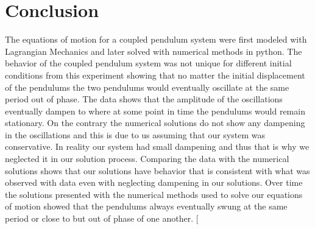\documentclass[twocolumn]{article}
\begin{document}
\section*{Conclusion}
The equations of motion for a coupled pendulum system were first modeled with Lagrangian Mechanics and later solved with numerical methods in python. The behavior of the coupled pendulum system was not unique for different initial conditions from this experiment showing that no matter the initial displacement of the pendulums the two pendulums would eventually oscillate at the same period out of phase. The data shows that the amplitude of the oscillations eventually dampen to where at some point in time the pendulums would remain stationary. On the contrary the numerical solutions do not show any dampening in the oscillations and this is due to us assuming that our system was conservative. In reality our system had small dampening and thus that is why we neglected it in our solution process. Comparing the data with the numerical solutions shows that our solutions have behavior that is consistent with what was observed with data even with neglecting dampening in our solutions. Over time the solutions presented with the numerical methods used to solve our equations of motion showed that the pendulums always eventually swung at the same period or close to but out of phase of one another.
\clearpage
\twocolumn[
\end{document}
